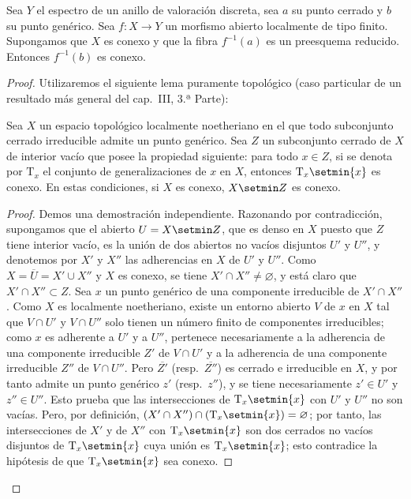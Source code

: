 \begin{lemma}[15.5.6]
\label{IV.15.5.6}
Sea $Y$ el espectro de un anillo de valoración discreta, sea $a$ su punto cerrado y $b$ su punto genérico.
Sea $f:X\to Y$ un morfismo abierto localmente de tipo finito.
Supongamos que $X$ es conexo y que la fibra $f^{-1}(a)$ es un preesquema reducido.
Entonces $f^{-1}(b)$ es conexo.
\end{lemma}

\begin{proof}
Utilizaremos el siguiente lema puramente topológico (caso particular de un resultado más general del cap.\ III, 3.ª Parte):

\begin{lemma}[15.5.6.1]
\label{IV.15.5.6.1}
Sea $X$ un espacio topológico localmente noetheriano en el que todo subconjunto cerrado irreducible admite un punto genérico.
Sea $Z$ un subconjunto cerrado de $X$ de interior vacío que posee la propiedad siguiente: para todo $x\in Z$, si se denota por $\mathrm{T}_x$ el conjunto de generalizaciones de $x$ en $X$, entonces $\mathrm{T}_x\setmin\{x\}$ es conexo.
En estas condiciones, si $X$ es conexo, $X\setmin Z$ es conexo.
\end{lemma}

\begin{proof}
Demos una demostración independiente.
Razonando por contradicción, supongamos que el abierto $U=X\setmin Z$, que es denso en $X$ puesto que $Z$ tiene interior vacío, es la unión de dos abiertos no vacíos disjuntos $U'$ y $U''$, y denotemos por $X'$ y $X''$ las adherencias en $X$ de $U'$ y $U''$.
Como $X=\overline{U}=X'\cup X''$ y $X$ es conexo, se tiene $X'\cap X''\neq\varnothing$, y está claro que $X'\cap X''\subset Z$.
Sea $x$ un punto genérico de una componente irreducible de $X'\cap X''$.
Como $X$ es localmente noetheriano, existe un entorno abierto $V$ de $x$ en $X$ tal que $V\cap U'$ y $V\cap U''$ solo tienen un número finito de componentes irreducibles; como $x$ es adherente a $U'$ y a $U''$, pertenece necesariamente a la adherencia de una componente irreducible $Z'$ de $V\cap U'$ y a la adherencia de una componente irreducible $Z''$ de $V\cap U''$.
Pero $\overline{Z'}$ (resp.\ $\overline{Z''}$) es cerrado e irreducible en $X$, y por tanto admite un punto genérico $z'$ (resp.\ $z''$), y se tiene necesariamente $z'\in U'$ y $z''\in U''$.
Esto prueba que las intersecciones de $\mathrm{T}_x\setmin\{x\}$ con $U'$ y $U''$ no son vacías.
Pero, por definición, $(X'\cap X'')\cap(\mathrm{T}_x\setmin\{x\})=\varnothing$; por tanto, las intersecciones de $X'$ y de $X''$ con $\mathrm{T}_x\setmin\{x\}$ son dos cerrados no vacíos disjuntos de $\mathrm{T}_x\setmin\{x\}$ cuya unión es $\mathrm{T}_x\setmin\{x\}$; esto contradice la hipótesis de que $\mathrm{T}_x\setmin\{x\}$ sea conexo.
\end{proof}
\end{proof}

